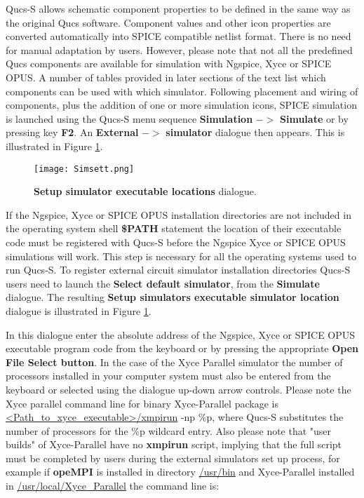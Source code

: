 \noindent Qucs-S allows schematic component properties to be defined in the same way as the original Qucs software. Component values and other icon properties are converted automatically into SPICE compatible netlist format. There is no need for manual adaptation by users. However, please note that not all the predefined Qucs components are available for simulation with Ngspice, Xyce or SPICE OPUS.   A number of tables provided in later sections of the text list which components can be used with which simulator. Following placement and wiring of components, plus the addition of one or more simulation icons, SPICE simulation is launched using the Qucs-S menu sequence  \textbf{Simulation} $->$ \textbf{Simulate} or by pressing key \textbf{F2}.  An  \textbf{External} $->$ \textbf{simulator} dialogue  then appears.  This is illustrated in Figure \ref{Fig10}.
\newpage
 \begin{figure}[h]
	\centering
	\texttt{[image: Simsett.png]}
	\caption{\textbf{Setup simulator executable locations} dialogue.}
	\label{Fig10}
\end{figure}

\noindent If the Ngspice, Xyce or SPICE OPUS installation directories are not included in the operating system shell \textbf{\$PATH} statement the location of their executable code must be registered with Qucs-S before the Ngspice Xyce or SPICE OPUS simulations will work. This step is necessary for all the operating systems used to run Qucs-S.
To register external circuit simulator installation directories Qucs-S users need to launch the \textbf{Select default simulator}, from the \textbf{Simulate} dialogue. The resulting \textbf{Setup simulators executable simulator location} dialogue is illustrated in Figure \ref{Fig10}.

In this dialogue enter the absolute address of the Ngspice, Xyce or SPICE OPUS executable program code from the keyboard or by pressing the appropriate \textbf{Open File Select button}.
In the case of the Xyce Parallel simulator the number of processors installed in your computer system must also be entered from the keyboard or selected using the dialogue up-down arrow controls. Please note the Xyce parallel command line for binary Xyce-Parallel package is  \url{<Path_to_xyce_executable>/xmpirun} -np  \%p, where Qucs-S substitutes the number of processors for the \%p wildcard entry. Also please note that "user builds" of Xyce-Parallel have no \textbf{xmpirun} script, implying that the full script must be completed by users during the external simulators set up process, for example if \textbf{opeMPI} is installed in directory \url{/usr/bin} and Xyce-Parallel installed in  \url{/usr/local/Xyce_Parallel} the command line is:
\newline

